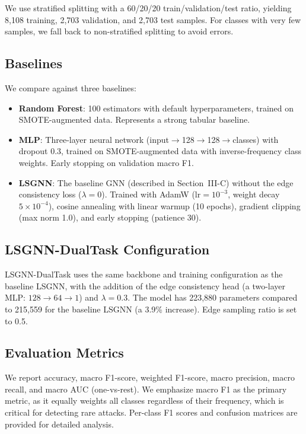 \documentclass[conference]{IEEEtran}
\begin{document}
We use stratified splitting with a 60/20/20 train/validation/test ratio, yielding 8{,}108 training, 2{,}703 validation, and 2{,}703 test samples. For classes with very few samples, we fall back to non-stratified splitting to avoid errors.

\subsection{Baselines}

We compare against three baselines:
\begin{itemize}
    \item \textbf{Random Forest}: 100 estimators with default hyperparameters, trained on SMOTE-augmented data. Represents a strong tabular baseline.
    \item \textbf{MLP}: Three-layer neural network (input$\rightarrow$128$\rightarrow$128$\rightarrow$classes) with dropout 0.3, trained on SMOTE-augmented data with inverse-frequency class weights. Early stopping on validation macro F1.
    \item \textbf{LSGNN}: The baseline GNN (described in Section~III-C) without the edge consistency loss ($\lambda = 0$). Trained with AdamW ($\text{lr}=10^{-3}$, weight decay $5 \times 10^{-4}$), cosine annealing with linear warmup (10 epochs), gradient clipping (max norm 1.0), and early stopping (patience 30).
\end{itemize}

\subsection{LSGNN-DualTask Configuration}

LSGNN-DualTask uses the same backbone and training configuration as the baseline LSGNN, with the addition of the edge consistency head (a two-layer MLP: $128 \rightarrow 64 \rightarrow 1$) and $\lambda = 0.3$. The model has 223{,}880 parameters compared to 215{,}559 for the baseline LSGNN (a 3.9\% increase). Edge sampling ratio is set to 0.5.

\subsection{Evaluation Metrics}

We report accuracy, macro F1-score, weighted F1-score, macro precision, macro recall, and macro AUC (one-vs-rest). We emphasize macro F1 as the primary metric, as it equally weights all classes regardless of their frequency, which is critical for detecting rare attacks. Per-class F1 scores and confusion matrices are provided for detailed analysis.
\end{document}
